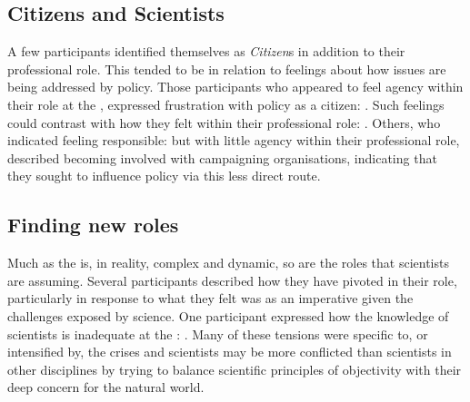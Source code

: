 
\subsection{Citizens and Scientists}

A few participants identified themselves as \emph{Citizen}s in addition to their professional role. This tended to be in relation to feelings about how \CAN{} issues are being addressed by policy. Those participants who appeared to feel agency within their role at the \SPI, expressed frustration with policy as a citizen: . Such feelings could contrast with how they felt within their professional role: . Others, who indicated feeling responsible:  but with little agency within their professional role, described becoming involved with campaigning organisations, indicating that they sought to influence policy via this less direct route.

\subsection{Finding new roles}

Much as the \SPI{} is, in reality, complex and dynamic, so are the roles that scientists are assuming. Several participants described how they have pivoted in their role, particularly in response to what they felt was as an imperative given the challenges exposed by \CAN{} science. %
One participant expressed how the knowledge of scientists is inadequate at the \CAN{} \SPI: . Many of these tensions were specific to, or intensified by, the \CAN{} crises and \CAN{} scientists may be more conflicted than scientists in other disciplines by trying to balance scientific principles of objectivity with their deep concern for the natural world.

